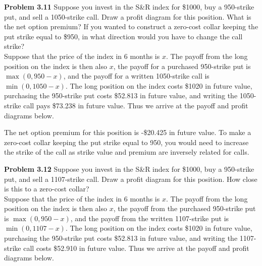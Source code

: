 \documentclass[12pt]{article}
\newcommand{\problem}[1]{\bigskip \noindent \textbf{Problem #1}}
\theoremstyle{plain}
\begin{document}
\problem{3.11} Suppose you invest in the S\&R index for \$1000, buy a 950-strike put, and sell a 1050-strike call. Draw a profit diagram for this position. What is the net option premium? If you wanted to construct a zero-cost collar keeping the put strike equal to \$950, in what direction would you have to change the call strike?\\

Suppose that the price of the index in 6 months is $x$. The payoff from the long position on the index is then also $x$, the payoff for a purchased 950-strike put is $\max(0,950-x)$, and the payoff for a written 1050-strike call is $\min(0,1050-x)$. The long position on the index costs \$1020 in future value, purchasing the 950-strike put costs \$52.813 in future value, and writing the 1050-strike call pays \$73.238 in future value. Thus we arrive at the payoff and profit diagrams below.

\begin{center}
\end{center}
The net option premium for this position is -\$20.425 in future value. To make a zero-cost collar keeping the put strike equal to 950, you would need to increase the strike of the call as strike value and premium are inversely related for calls.

\problem{3.12} Suppose you invest in the S\&R index for \$1000, buy a 950-strike put, and sell a 1107-strike call. Draw a profit diagram for this position. How close is this to a zero-cost collar? \\

Suppose that the price of the index in 6 months is $x$. The payoff from the long position on the index is then also $x$, the payoff from the purchased 950-strike put is $\max(0,950-x)$, and the payoff from the written 1107-strike put is $\min(0,1107-x)$. The long position on the index costs \$1020 in future value, purchasing the 950-strike put costs \$52.813 in future value, and writing the 1107-strike call costs \$52.910 in future value. Thus we arrive at the payoff and profit diagrams below.
\end{document}
